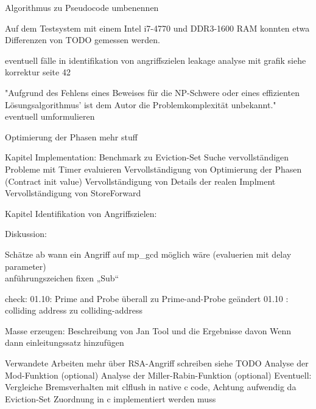 Algorithmus zu Pseudocode umbenennen

Auf dem Testsystem mit einem Intel i7-4770 und DDR3-1600 RAM konnten etwa Differenzen von TODO gemessen werden.


eventuell fälle in identifikation von angriffszielen leakage analyse mit grafik siehe korrektur seite 42

"Aufgrund des Fehlens eines Beweises für die NP-Schwere oder eines effizienten Lösungsalgorithmus' ist dem Autor die Problemkomplexität unbekannt."
eventuell umformulieren

Optimierung der Phasen mehr stuff


Kapitel Implementation:
Benchmark zu Eviction-Set Suche vervollständigen
Probleme mit Timer evaluieren
Vervollständigung von Optimierung der Phasen (Contract init value)
Vervollständigung von Details der realen Implment
Vervollständigung von StoreForward

Kapitel Identifikation von Angriffszielen:


Diskussion:


Schätze ab wann ein Angriff auf mp_gcd möglich wäre (evaluerien mit delay parameter)\\




anführungszeichen fixen „Sub“





check: 01.10: Prime and Probe überall zu Prime-and-Probe geändert
01.10 : colliding address zu colliding-address

Masse erzeugen:
Beschreibung von Jan Tool und die Ergebnisse davon
Wenn dann einleitungssatz hinzufügen

Verwandete Arbeiten mehr über RSA-Angriff schreiben siehe TODO
Analyse der Mod-Funktion (optional)
Analyse der Miller-Rabin-Funktion (optional)
Eventuell: Vergleiche Bremsverhalten mit clflush in native c code,
Achtung aufwendig da Eviction-Set Zuordnung in c implementiert werden muss



